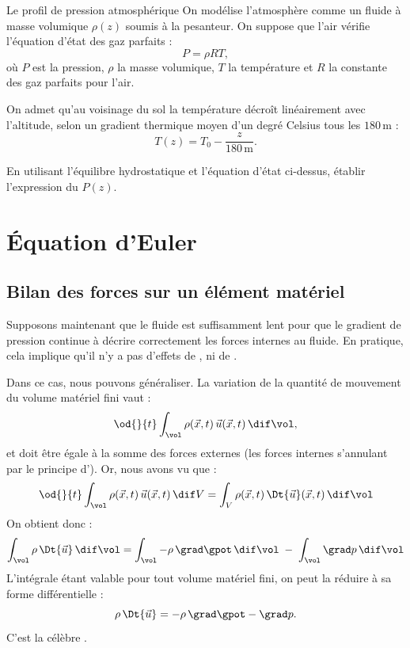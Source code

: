 \begin{studentinvestigation}{Le profil de pression atmosphérique}
On modélise l’atmosphère comme un fluide à masse volumique $\rho(z)$ soumis à la pesanteur.
On suppose que l’air vérifie l’équation d’état des gaz parfaits :
\[
P = \rho R T,
\]
où $P$ est la pression, $\rho$ la masse volumique, $T$ la température et $R$ la constante des gaz parfaits pour l’air.

On admet qu’au voisinage du sol la température décroît linéairement avec l’altitude, selon un gradient thermique moyen d’un degré Celsius tous les $180\,\text{m}$ :
\[
  T(z) = T_0 - \dfrac{z}{180\,\text{m}}.
\]

\medskip

En utilisant l’équilibre hydrostatique et l’équation d’état ci-dessus, établir l’expression du  $P(z)$.
\end{studentinvestigation}

\section{Équation d'Euler}

\subsection{Bilan des forces sur un élément matériel}
Supposons maintenant que le fluide est suffisamment lent pour que le gradient de pression continue à décrire correctement les forces internes au fluide. En pratique, cela implique qu’il n’y a pas d’effets de , ni de .

Dans ce cas, nous pouvons généraliser. La variation de la quantité de mouvement du volume matériel fini vaut :
\begin{equation}
  \od{}{t} \int_\vol \rho(\vec{x},t) \, \vec{u}(\vec{x},t) \, \dif \vol,
  \label{eq:momentum_balance}
\end{equation}
et doit être égale à la somme des forces externes (les forces internes s’annulant par le principe d’). Or, nous avons vu que :
\begin{equation}
  \od{}{t} \int_\vol \rho(\vec{x},t) \, \vec{u}(\vec{x},t) \, \dif V = \int_V \rho(\vec{x},t) \, \Dt{\vec{u}}(\vec{x},t) \, \dif \vol
  \label{eq:material_acceleration}
\end{equation}
On obtient donc :
\begin{equation}
  \int_\vol \rho \, \Dt{\vec{u}} \, \dif \vol = \int_\vol - \rho \, \grad \gpot \, \dif \vol \; - \; \int_\vol \grad p \, \dif \vol
  \label{eq:euler_integral}
\end{equation}
L’intégrale étant valable pour tout volume matériel fini, on peut la réduire à sa forme différentielle :
\begin{equation}
  \rho \, \Dt{\vec{u}} = - \rho \, \grad \gpot - \grad p.
  \label{eq:euler}
\end{equation}
C’est la célèbre .


